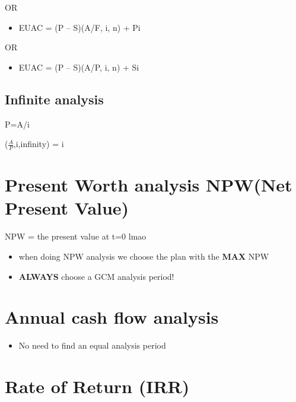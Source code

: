 \documentclass[]{article}
\providecommand{\tightlist}{%
  \setlength{\itemsep}{0pt}\setlength{\parskip}{0pt}}
\begin{document}
OR

\begin{itemize}
\tightlist
\item
  EUAC = (P -- S)(A/F, i, n) + Pi
\end{itemize}

OR

\begin{itemize}
\tightlist
\item
  EUAC = (P -- S)(A/P, i, n) + Si
\end{itemize}

\hypertarget{infinite-analysis}{%
\subsection{Infinite analysis}\label{infinite-analysis}}

P=A/i

(\(\frac{A}{P}\),i,infinity) = i

\hypertarget{present-worth-analysis-npwnet-present-value}{%
\section{Present Worth analysis NPW(Net Present
Value)}\label{present-worth-analysis-npwnet-present-value}}

NPW = the present value at t=0 lmao

\begin{itemize}
\tightlist
\item
  when doing NPW analysis we choose the plan with the \textbf{MAX} NPW
\item
  \textbf{ALWAYS} choose a GCM analysis period!
\end{itemize}

\hypertarget{annual-cash-flow-analysis}{%
\section{Annual cash flow analysis}\label{annual-cash-flow-analysis}}

\begin{itemize}
\tightlist
\item
  No need to find an equal analysis period
\end{itemize}

\hypertarget{rate-of-return-irr}{%
\section{Rate of Return (IRR)}\label{rate-of-return-irr}}
\end{document}
